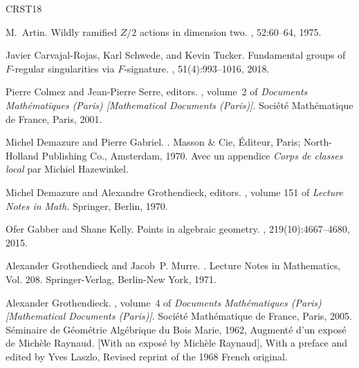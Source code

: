 \documentclass{amsart}
\theoremstyle{remark}
\numberwithin{equation}{section}
\begin{document}

\begin{thebibliography}{CRST18}

M.~Artin.
\newblock Wildly ramified {$Z/2$} actions in dimension two.
, 52:60--64, 1975.

Javier Carvajal-Rojas, Karl Schwede, and Kevin Tucker.
\newblock Fundamental groups of {$F$}-regular singularities via
  {$F$}-signature.
, 51(4):993--1016, 2018.

Pierre Colmez and Jean-Pierre Serre, editors.
, volume~2 of {\em
  Documents Math\'{e}matiques (Paris) [Mathematical Documents (Paris)]}.
\newblock Soci\'{e}t\'{e} Math\'{e}matique de France, Paris, 2001.

Michel Demazure and Pierre Gabriel.
.
\newblock Masson \& Cie, \'Editeur, Paris; North-Holland Publishing Co.,
  Amsterdam, 1970.
\newblock Avec un appendice {\it Corps de classes local} par Michiel
  Hazewinkel.

Michel Demazure and Alexandre Grothendieck, editors.
, volume 151 of {\em
  Lecture Notes in Math.}
\newblock Springer, Berlin, 1970.

Ofer Gabber and Shane Kelly.
\newblock Points in algebraic geometry.
, 219(10):4667--4680, 2015.

Alexander Grothendieck and Jacob~P. Murre.
.
\newblock Lecture Notes in Mathematics, Vol. 208. Springer-Verlag, Berlin-New
  York, 1971.

Alexander Grothendieck.
, volume~4 of {\em
  Documents Math\'{e}matiques (Paris) [Mathematical Documents (Paris)]}.
\newblock Soci\'{e}t\'{e} Math\'{e}matique de France, Paris, 2005.
\newblock S\'{e}minaire de G\'{e}om\'{e}trie Alg\'{e}brique du Bois Marie,
  1962, Augment\'{e} d'un expos\'{e} de Mich\`ele Raynaud. [With an expos\'{e}
  by Mich\`ele Raynaud], With a preface and edited by Yves Laszlo, Revised
  reprint of the 1968 French original.


\end{thebibliography}
\end{document}

